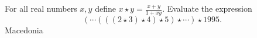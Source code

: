For all real numbers $x,y$ define $x\star y = \frac{ x+y}{ 1+xy}$. Evaluate the expression \[ ( \cdots (((2 \star 3) \star 4) \star 5) \star \cdots ) \star 1995. \]Macedonia
